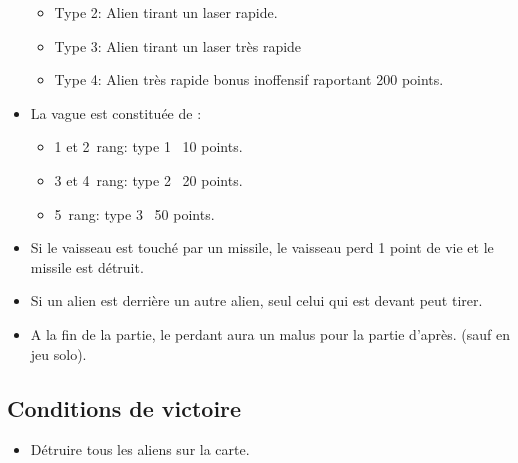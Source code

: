 \documentclass[french, 11pt]{article}
\begin{document}
\begin{itemize}
\begin{itemize}
				\item Type 2: Alien tirant un laser rapide.
				\item Type 3: Alien tirant un laser très rapide 
				\item Type 4: Alien très rapide bonus inoffensif raportant 200 points. 
			\end{itemize}
			\item La vague est constituée de :
			\begin{itemize}
				\item 1\ier{} et 2\ieme{}~rang: type 1 \textrightarrow~10 points.
				\item 3\ieme{} et 4\ieme{}~rang: type 2 \textrightarrow~20 points.
				\item 5\ieme{}~rang: type 3 \textrightarrow~50 points.
			\end{itemize}
			\item Si le vaisseau est touché par un missile, le vaisseau perd 1 point de vie et le missile est détruit.
			\item Si un alien est derrière un autre alien, seul celui qui est devant peut tirer.
			\item A la fin de la partie, le perdant aura un malus pour la partie d'après. (sauf en jeu solo).
		\end{itemize}
		\subsection{Conditions de victoire}\label{conditionsDeVictoire}
		\begin{itemize}
			\item Détruire tous les aliens sur la carte.
		\end{itemize}
		
\end{document}
